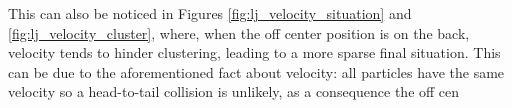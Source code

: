 \documentclass[../../master_thesis_np.tex]{subfiles}
\begin{document}
		This can also be noticed in Figures \ref{fig:lj_velocity_situation} and \ref{fig:lj_velocity_cluster}, where, when the off center position is on the back, velocity tends to hinder clustering, leading to a more sparse final situation. This can be due to the aforementioned fact about velocity: all particles have the same velocity so a head-to-tail collision is unlikely, as a consequence the off cen
		
		\begin{figure}[htp]
			\centering
			\\
			\\

\end{figure}
\end{document}

